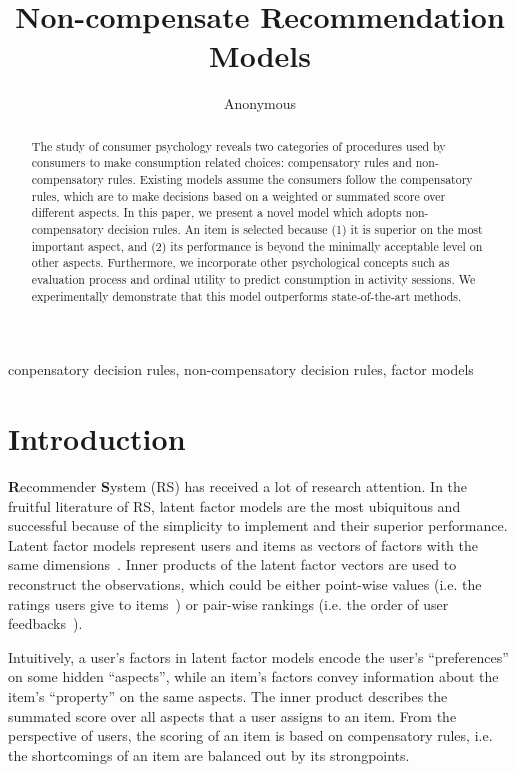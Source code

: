 \documentclass[conference]{IEEEtran}
\begin{document}
\title{Non-compensate Recommendation Models
}

\author{Anonymous
}

\maketitle

\begin{abstract}
The study of consumer psychology reveals two categories of procedures used by consumers to make consumption related choices: compensatory rules and non-compensatory rules. Existing models assume the consumers follow the compensatory rules, which are to make decisions based on a weighted or summated score over different aspects. In this paper, we present a novel model which adopts non-compensatory decision rules. An item is selected because  (1) it is superior on the most important aspect, and (2) its performance is beyond the minimally acceptable level on other aspects. Furthermore, we incorporate other psychological concepts such as evaluation process and ordinal utility to predict consumption in activity sessions. We experimentally demonstrate that this model outperforms state-of-the-art methods.
\end{abstract}

\begin{IEEEkeywords}
conpensatory decision rules, non-compensatory decision rules, factor models 
\end{IEEEkeywords}

\section{Introduction}\label{sec:introduction}
\textbf{R}ecommender \textbf{S}ystem (RS) has received a lot of research attention. In the fruitful literature of RS, latent factor models are the most ubiquitous and successful  because of the simplicity to implement and their superior performance. Latent factor models represent users and items as vectors of factors with the same dimensions~\cite{Gopalan2015Scalable,Hu2008Collaborative}. Inner products of the latent factor vectors are used to reconstruct the observations, which could be either point-wise values (i.e. the ratings users give to items~\cite{}) or pair-wise rankings (i.e. the order of user feedbacks~\cite{}).


Intuitively, a user's factors in latent factor models encode the user's ``preferences'' on some hidden ``aspects'', while an item's factors convey information about the item's ``property'' on the same aspects. The inner product describes the summated score over all aspects that a user assigns to an item. From the perspective of users, the scoring of an item is based on compensatory rules, i.e. the shortcomings of an item are balanced out by its strongpoints. 
\end{document}
